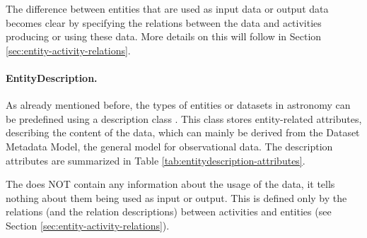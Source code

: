 
The difference between entities that are used as input data or output data 
becomes clear by specifying the relations between the data and activities producing or using these data.
More details on this will follow in Section \ref{sec:entity-activity-relations}.

\paragraph{EntityDescription.}
As already mentioned before, the types of entities or datasets in astronomy 
can be predefined using a description
class .
This class stores entity-related 
attributes, describing the content of the data, which can mainly be derived from 
the Dataset Metadata Model, the general model for observational data.
The description attributes are summarized in Table 
\ref{tab:entitydescription-attributes}.

The  does NOT contain any information about the usage 
of the data, it tells nothing about them being used as input or output. This is 
defined only by the relations (and the relation descriptions) between activities
and entities (see Section \ref{sec:entity-activity-relations}).


